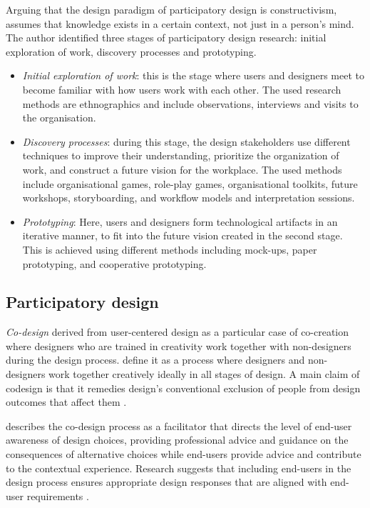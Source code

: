 \documentclass[preprint,12pt]{elsarticle}
\begin{document}
Arguing that the design paradigm of participatory design is constructivism,\citet{spinuzzi2005methodology} assumes that knowledge exists in a certain context, not just in a person’s mind. The author identified three stages of participatory design research: initial exploration of work, discovery processes and prototyping. 
\begin{itemize}
    \item \textit{Initial exploration of work}: this is the stage where users and designers meet to become familiar with how users work with each other. The used research methods are ethnographics and include observations, interviews and visits to the organisation.
    \item \textit{Discovery processes}: during this stage, the design stakeholders use different techniques to improve their understanding, prioritize the organization of work, and construct a future vision for the workplace. The used methods include organisational games, role-play games, organisational toolkits, future workshops, storyboarding, and workflow models and interpretation sessions.
    \item \textit{Prototyping}: Here, users and designers form technological artifacts in an iterative manner, to fit into the future vision created in the second stage. This is achieved using different methods including mock-ups, paper prototyping, and cooperative prototyping.
\end{itemize}

\subsection{Participatory design}
\textit{Co-design} derived from user-centered design as a particular case of co-creation where designers who are trained in creativity work together with non-designers during the design process. \cite{Sanders2008} define it as a process where designers and non-designers work together creatively ideally in all stages of design. A main claim of codesign is that it remedies design’s conventional exclusion of people from design outcomes that affect them \cite{taffe2015hybrid}.

\cite{siu2003users} describes the co-design process as a facilitator that directs the level of end-user awareness of design choices, providing professional advice and guidance on the consequences of alternative choices while end-users provide advice and contribute to the contextual experience.  Research suggests that including end-users in the design process ensures appropriate design responses that are aligned with end-user requirements \cite{taffe2015hybrid}. 
\end{document}
